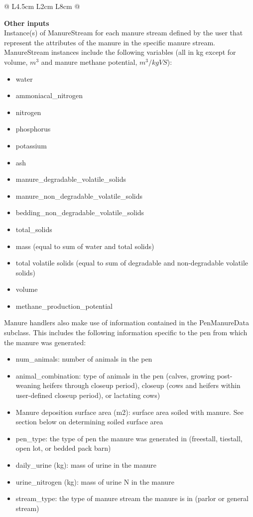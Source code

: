 \begin{refsection}
\begin{table}[h!]
\begin{tabular}{@{} L{4.5cm} L{2cm} L{8cm} @{}}
    \bottomrule
    \end{tabular}
    \end{table}  
    \vspace{ 0.25cm}
    
\textbf{Other inputs}\\
Instance(s) of ManureStream for each manure stream defined by the user that represent the attributes of the manure in the specific manure stream. ManureStream instances include the following variables (all in kg except for volume, \(m^3\) and manure methane potential, \(m^3 / kgVS\)):
    \begin{itemize}
        \item water 
        \item ammoniacal\_nitrogen
        \item nitrogen 
        \item phosphorus
        \item potassium
        \item ash
        \item manure\_degradable\_volatile\_solids
        \item manure\_non\_degradable\_volatile\_solids
        \item bedding\_non\_degradable\_volatile\_solids
        \item total\_solids
        \item mass (equal to sum of water and total solids)
        \item total volatile solids (equal to sum of degradable and non-degradable volatile solids)
        \item volume
        \item methane\_production\_potential

    \end{itemize}

Manure handlers also make use of information contained in the PenManureData subclass. This includes the following information specific to the pen from which the manure was generated:
\begin{itemize}
    \item num\_animals: number of animals in the pen
    \item animal\_combination: type of animals in the pen (calves, growing post-weaning heifers through closeup period), closeup (cows and heifers within user-defined closeup period), or lactating cows)
    \item Manure deposition surface area (m2): surface area soiled with manure. See section below on determining soiled surface area
    \item pen\_type: the type of pen the manure was generated in (freestall, tiestall, open lot, or bedded pack barn)
    \item daily\_urine (kg): mass of urine in the manure
    \item urine\_nitrogen (kg): mass of urine N in the manure
    \item stream\_type: the type of manure stream the manure is in (parlor or general stream)


\end{itemize}
\end{refsection}
